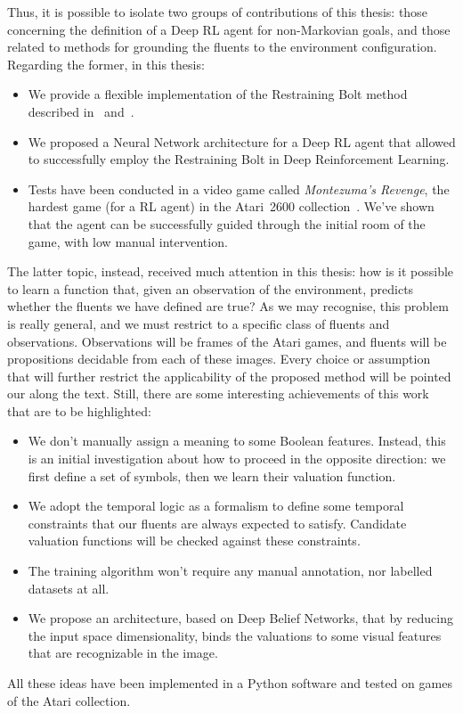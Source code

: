 Thus, it is possible to isolate two groups of contributions of this thesis:
those concerning the definition of a Deep RL agent for non-Markovian goals,
and those related to methods for grounding the fluents to the environment
configuration. Regarding the former, in this thesis:
\begin{itemize}
		\item We provide a flexible implementation of the Restraining Bolt method
			described in~\cite{bib:bolt} and~\cite{bib:degiacomo-logic-nmrdp}.
		\item We proposed a Neural Network architecture for a Deep RL agent that
			allowed to successfully employ the Restraining Bolt in Deep
			Reinforcement Learning.
		\item Tests have been conducted in a video game called \emph{Montezuma's
			Revenge}, the hardest game (for a RL agent) in the Atari~2600
			collection~\cite{bib:atari-deepq-nature}. We've shown that the agent can
			be successfully guided through the initial room of the game, with low
			manual intervention.
\end{itemize}

The latter topic, instead, received much attention in this thesis: how is it
possible to learn a function that, given an observation of the environment,
predicts whether the fluents we have defined are true? As we may recognise,
this problem is really general, and we must restrict to a specific class of
fluents and observations. Observations will be frames of the Atari games, and
fluents will be propositions decidable from each of these images. Every choice
or assumption that will further restrict the applicability of the proposed
method will be pointed our along the text. Still, there are some interesting
achievements of this work that are to be highlighted:
\begin{itemize}
	\item We don't manually assign a meaning to some Boolean features.
		Instead, this is an initial investigation about how to proceed in the
		opposite direction: we first define a set of symbols, then we learn their
		valuation function.
	\item We adopt the temporal logic \ldl{} as a formalism to define some
		temporal constraints that our fluents are always expected to satisfy.
		Candidate valuation functions will be checked against these constraints.
	\item The training algorithm won't require any manual annotation,
		nor labelled datasets at all.
	\item We propose an architecture, based on Deep Belief Networks, that by
		reducing the input space dimensionality, binds the valuations to some
		visual features that are recognizable in the image.
\end{itemize}
All these ideas have been implemented in a Python software and tested on games
of the Atari collection.

